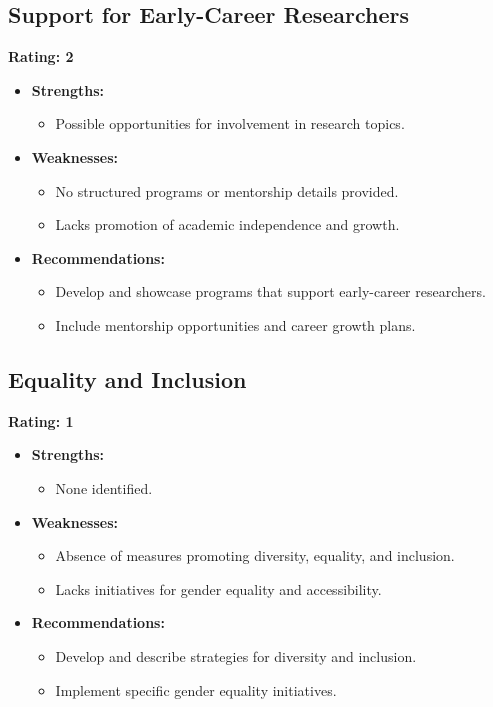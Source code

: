 \documentclass{article}
\begin{document}
\subsection{Support for Early-Career Researchers}

\textbf{Rating: 2}

\begin{itemize}
    \item \textbf{Strengths:}
    \begin{itemize}
        \item Possible opportunities for involvement in research topics.
    \end{itemize}
    \item \textbf{Weaknesses:}
    \begin{itemize}
        \item No structured programs or mentorship details provided.
        \item Lacks promotion of academic independence and growth.
    \end{itemize}
    \item \textbf{Recommendations:}
    \begin{itemize}
        \item Develop and showcase programs that support early-career researchers.
        \item Include mentorship opportunities and career growth plans.
    \end{itemize}
\end{itemize}

\subsection{Equality and Inclusion}

\textbf{Rating: 1}

\begin{itemize}
    \item \textbf{Strengths:}
    \begin{itemize}
        \item None identified.
    \end{itemize}
    \item \textbf{Weaknesses:}
    \begin{itemize}
        \item Absence of measures promoting diversity, equality, and inclusion.
        \item Lacks initiatives for gender equality and accessibility.
    \end{itemize}
    \item \textbf{Recommendations:}
    \begin{itemize}
        \item Develop and describe strategies for diversity and inclusion.
        \item Implement specific gender equality initiatives.
    \end{itemize}
\end{itemize}
\end{document}
